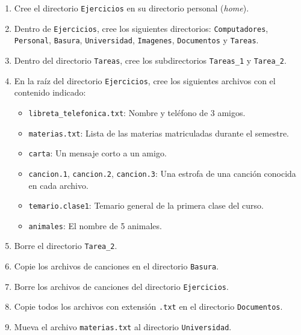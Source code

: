 \documentclass[12pt]{article}
\begin{document}
\begin{problemas}[]
    \begin{enumerate}
    \item Cree el directorio \lstinline|Ejercicios| en su directorio personal (\textit{home}).
    
    \item Dentro de \lstinline|Ejercicios|, cree los siguientes directorios: \lstinline|Computadores|, \lstinline|Personal|, \lstinline|Basura|, \lstinline|Universidad|, \lstinline|Imagenes|, \lstinline|Documentos| y \lstinline|Tareas|.
    
    \item Dentro del directorio \lstinline|Tareas|, cree los subdirectorios \lstinline|Tareas_1| y \lstinline|Tarea_2|.
    
    \item En la raíz del directorio \lstinline|Ejercicios|, cree los siguientes archivos con el contenido indicado:
    \begin{itemize}
        \item \lstinline|libreta_telefonica.txt|: Nombre y teléfono de 3 amigos.
        \item \lstinline|materias.txt|: Lista de las materias matriculadas durante el semestre.
        \item \lstinline|carta|: Un mensaje corto a un amigo.
        \item \lstinline|cancion.1|, \lstinline|cancion.2|, \lstinline|cancion.3|: Una estrofa de una canción conocida en cada archivo.
        \item \lstinline|temario.clase1|: Temario general de la primera clase del curso.
        \item \lstinline|animales|: El nombre de 5 animales.
    \end{itemize}
    
    \item Borre el directorio \lstinline|Tarea_2|.
    
    \item Copie los archivos de canciones en el directorio \lstinline|Basura|.
    
    \item Borre los archivos de canciones del directorio \lstinline|Ejercicios|.
    
    \item Copie todos los archivos con extensión \lstinline|.txt| en el directorio \lstinline|Documentos|.
    
    \item Mueva el archivo \lstinline|materias.txt| al directorio \lstinline|Universidad|.
    

\end{enumerate}
\end{problemas}
\end{document}

